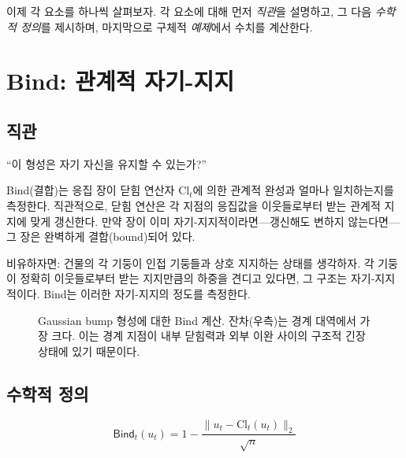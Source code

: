 이제 각 요소를 하나씩 살펴보자. 각 요소에 대해 먼저 \emph{직관}을 설명하고, 그 다음 \emph{수학적 정의}를 제시하며, 마지막으로 구체적 \emph{예제}에서 수치를 계산한다.


\section{Bind: 관계적 자기-지지}
\label{sec:bind}

\subsection{직관}

``이 형성은 자기 자신을 유지할 수 있는가?''

Bind(결합)는 응집 장이 닫힘 연산자 $\mathrm{Cl}_t$에 의한 관계적 완성과 얼마나 일치하는지를 측정한다. 직관적으로, 닫힘 연산은 각 지점의 응집값을 이웃들로부터 받는 관계적 지지에 맞게 갱신한다. 만약 장이 이미 자기-지지적이라면---갱신해도 변하지 않는다면---그 장은 완벽하게 결합(bound)되어 있다.

비유하자면: 건물의 각 기둥이 인접 기둥들과 상호 지지하는 상태를 생각하자. 각 기둥이 정확히 이웃들로부터 받는 지지만큼의 하중을 견디고 있다면, 그 구조는 자기-지지적이다. Bind는 이러한 자기-지지의 정도를 측정한다.

\begin{figure}[t]
\centering
\caption{Gaussian bump 형성에 대한 Bind 계산. 잔차(우측)는 경계 대역에서 가장 크다. 이는 경계 지점이 내부 닫힘력과 외부 이완 사이의 구조적 긴장 상태에 있기 때문이다.}
\label{fig:bind-visualization}
\end{figure}


\subsection{수학적 정의}

\begin{equation}
    \boxed{\mathsf{Bind}_t(u_t) = 1 - \frac{\|u_t - \mathrm{Cl}_t(u_t)\|_2}{\sqrt{n}}}
    \label{eq:bind-def}
\end{equation}

